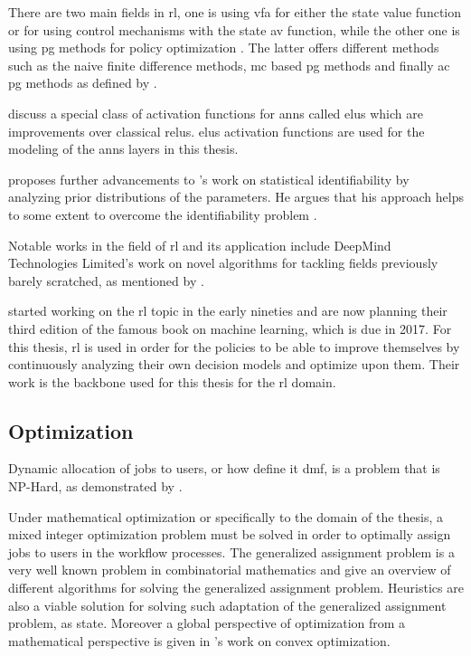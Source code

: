 \documentclass[draft=false]{seal_thesis}
\begin{document}
There are two main fields in \gls{rl}, one is using \gls{vfa} for either the state value function or for using control mechanisms with the state \gls{av} function, while the other one is using \gls{pg} methods for policy optimization \citep{Sutton2017}. The latter offers different methods such as the naive finite difference methods, \gls{mc} based \gls{pg} methods and finally \gls{ac} \gls{pg} methods as defined by \citet{Silver2014}.

\citet{Clevert2015} discuss a special class of activation functions for \glspl{ann} called \glspl{elu} which are improvements over classical \glspl{relu}. \glspl{elu} activation functions are used for the modeling of the \glspl{ann} layers in this thesis.

\citet{Gershman2016} proposes further advancements to \citet{Zhang2011}'s work on statistical identifiability by analyzing prior distributions of the parameters. He argues that his approach helps to some extent to overcome the identifiability problem \citep{Gershman2016}.

Notable works in the field of \gls{rl} and its application include DeepMind Technologies Limited's work on novel algorithms for tackling fields previously barely scratched, as mentioned by \citet{Mnih2015,Silver2016}.

\citet{Sutton2017} started working on the \gls{rl} topic in the early nineties and are now planning their third edition of the famous book on machine learning, which is due in 2017. For this thesis, \gls{rl} is used in order for the policies to be able to improve themselves by continuously analyzing their own decision models and optimize upon them. Their work is the backbone used for this thesis for the \gls{rl} domain.

\subsection{Optimization}

Dynamic allocation of jobs to users, or how \citet{Zeng2005} define it \ie \gls{dmf}, is a problem that is NP-Hard, as demonstrated by \citet{Garey1990}.

Under mathematical optimization or specifically to the domain of the thesis, a mixed integer optimization problem must be solved in order to optimally assign jobs to users in the workflow processes. The generalized assignment problem is a very well known problem in combinatorial mathematics and \citet{Cattrysse1992} give an overview of different algorithms for solving the generalized assignment problem. Heuristics are also a viable solution for solving such adaptation of the generalized assignment problem, as \citet{Racer1994} state. Moreover a global perspective of optimization from a mathematical perspective is given in \citet{Boyd2004}'s work on convex optimization.
\end{document}
